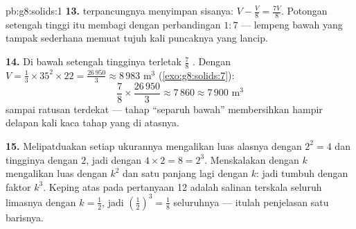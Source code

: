\begin{solution}{pb:g8:solids:1}
\textbf{13.}  terpancungnya menyimpan sisanya:
$V - \frac V8 = \frac{7V}{8}$. Potongan setengah tinggi itu membagi
 dengan perbandingan $1 : 7$ --- lempeng bawah yang tampak
sederhana memuat tujuh kali  puncaknya yang lancip.

\textbf{14.} Di bawah setengah tingginya terletak $\frac78$
. Dengan
$V = \frac13 \times 35^2 \times 22 = \frac{26\,950}{3} \approx
8\,983$ m$^3$ (\cref{exo:g8:solids:7}):
\[
\frac78 \times \frac{26\,950}{3} \approx 7\,860 \approx
7\,900 \text{ m}^3
\]
sampai ratusan terdekat --- tahap ``separuh bawah'' membersihkan
hampir delapan kali  kaca tahap yang di atasnya.

\textbf{15.} Melipatduakan setiap ukurannya mengalikan luas alasnya
dengan $2^2 = 4$ dan tingginya dengan $2$, jadi  dengan
$4 \times 2 = 8 = 2^3$. Menskalakan dengan $k$ mengalikan luas dengan
$k^2$ dan satu panjang lagi dengan $k$: jadi  tumbuh dengan
faktor $k^3$. Keping atas pada pertanyaan 12 adalah salinan terskala
seluruh limasnya dengan $k = \frac12$, jadi 
$\left(\frac12\right)^3 = \frac18$ seluruhnya --- itulah penjelasan
satu barisnya.

\end{solution}

